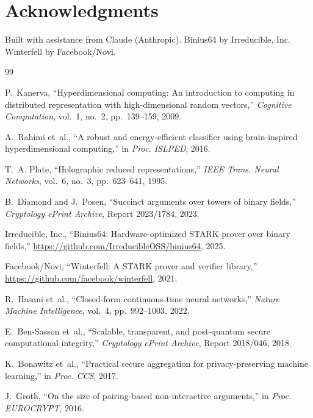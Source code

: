 \documentclass[11pt,twocolumn]{article}
\begin{document}
\section*{Acknowledgments}
Built with assistance from Claude (Anthropic). Binius64 by Irreducible, Inc. Winterfell by Facebook/Novi.



\begin{thebibliography}{99}

P.~Kanerva, ``Hyperdimensional computing: An introduction to computing in distributed representation with high-dimensional random vectors,'' \emph{Cognitive Computation}, vol.~1, no.~2, pp.~139--159, 2009.

A.~Rahimi et~al., ``A robust and energy-efficient classifier using brain-inspired hyperdimensional computing,'' in \emph{Proc. ISLPED}, 2016.

T.~A. Plate, ``Holographic reduced representations,'' \emph{IEEE Trans. Neural Networks}, vol.~6, no.~3, pp.~623--641, 1995.

B.~Diamond and J.~Posen, ``Succinct arguments over towers of binary fields,'' \emph{Cryptology ePrint Archive}, Report 2023/1784, 2023.

Irreducible, Inc., ``Binius64: Hardware-optimized STARK prover over binary fields,'' \url{https://github.com/IrreducibleOSS/binius64}, 2025.

Facebook/Novi, ``Winterfell: A STARK prover and verifier library,'' \url{https://github.com/facebook/winterfell}, 2021.

R.~Hasani et~al., ``Closed-form continuous-time neural networks,'' \emph{Nature Machine Intelligence}, vol.~4, pp.~992--1003, 2022.

E.~Ben-Sasson et~al., ``Scalable, transparent, and post-quantum secure computational integrity,'' \emph{Cryptology ePrint Archive}, Report 2018/046, 2018.

K.~Bonawitz et~al., ``Practical secure aggregation for privacy-preserving machine learning,'' in \emph{Proc. CCS}, 2017.

J.~Groth, ``On the size of pairing-based non-interactive arguments,'' in \emph{Proc. EUROCRYPT}, 2016.


\end{thebibliography}
\end{document}
